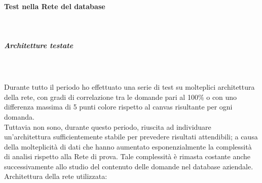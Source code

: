 \paragraph{Test nella Rete del database}\mbox{}\\
\label{Test nella Rete del database}
\noindent
\subparagraph{Architetture testate}\mbox{}\\\\
\label{Architetture testate}
\noindent
Durante tutto il periodo ho effettuato una serie di test su molteplici architettura della rete, con gradi di correlazione tra le domande pari al 100\% o con uno differenza massima di 5 punti colore rispetto al canvas risultante per ogni domanda.\\
Tuttavia non sono, durante questo periodo, riuscita ad individuare un'architettura sufficientemente stabile per prevedere risultati attendibili; a causa della molteplicit\`a di dati che hanno aumentato esponenzialmente  la complessit\`a di analisi rispetto alla Rete di prova. Tale complessit\`a \`e rimasta costante anche successivamente allo studio del contenuto delle domande nel database aziendale.
Architettura della rete utilizzata:

